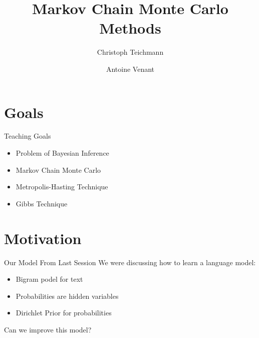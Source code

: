 \documentclass[11pt]{beamer}
\author{Christoph Teichmann \and Antoine Venant}
\title{Markov Chain Monte Carlo Methods}
\subtitle{}
\institute{}
\date{}
\begin{document}
	\centering
	
	
	\begin{frame}
		\maketitle
	\end{frame}
	
	\section{Goals}
	
	\begin{frame}{Teaching Goals}
		\begin{itemize}
			\item Problem of Bayesian Inference
			\item Markov Chain Monte Carlo
			\item Metropolis-Hasting Technique
			\item Gibbs Technique
		\end{itemize}
	\end{frame}
	
	\section{Motivation}
	
	\begin{frame}{Our Model From Last Session}
		We were discussing how to learn a language model:
		
		\vspace{10pt} \begin{itemize}
			\item Bigram podel for text
			\item Probabilities are hidden variables
			\item Dirichlet Prior for probabilities
		\end{itemize}
		
		\vspace{10pt} Can we improve this model?
	\end{frame}
		
\end{document}
